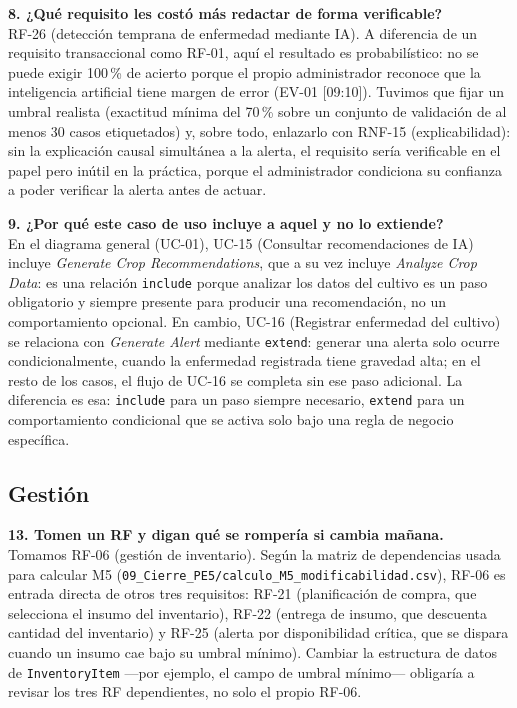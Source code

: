 \medskip
\noindent\textbf{8. ¿Qué requisito les costó más redactar de forma verificable?}\\
RF-26 (detección temprana de enfermedad mediante IA). A diferencia de un requisito transaccional como RF-01, aquí el resultado es probabilístico: no se puede exigir 100\,\% de acierto porque el propio administrador reconoce que la inteligencia artificial tiene margen de error (EV-01 [09:10]). Tuvimos que fijar un umbral realista (exactitud mínima del 70\,\% sobre un conjunto de validación de al menos 30 casos etiquetados) y, sobre todo, enlazarlo con RNF-15 (explicabilidad): sin la explicación causal simultánea a la alerta, el requisito sería verificable en el papel pero inútil en la práctica, porque el administrador condiciona su confianza a poder verificar la alerta antes de actuar.

\medskip
\noindent\textbf{9. ¿Por qué este caso de uso incluye a aquel y no lo extiende?}\\
En el diagrama general (UC-01), UC-15 (Consultar recomendaciones de IA) incluye \emph{Generate Crop Recommendations}, que a su vez incluye \emph{Analyze Crop Data}: es una relación \texttt{include} porque analizar los datos del cultivo es un paso obligatorio y siempre presente para producir una recomendación, no un comportamiento opcional. En cambio, UC-16 (Registrar enfermedad del cultivo) se relaciona con \emph{Generate Alert} mediante \texttt{extend}: generar una alerta solo ocurre condicionalmente, cuando la enfermedad registrada tiene gravedad alta; en el resto de los casos, el flujo de UC-16 se completa sin ese paso adicional. La diferencia es esa: \texttt{include} para un paso siempre necesario, \texttt{extend} para un comportamiento condicional que se activa solo bajo una regla de negocio específica.

\subsection*{Gestión}

\noindent\textbf{13. Tomen un RF y digan qué se rompería si cambia mañana.}\\
Tomamos RF-06 (gestión de inventario). Según la matriz de dependencias usada para calcular M5 (\texttt{09\_Cierre\_PE5/calculo\_M5\_modificabilidad.csv}), RF-06 es entrada directa de otros tres requisitos: RF-21 (planificación de compra, que selecciona el insumo del inventario), RF-22 (entrega de insumo, que descuenta cantidad del inventario) y RF-25 (alerta por disponibilidad crítica, que se dispara cuando un insumo cae bajo su umbral mínimo). Cambiar la estructura de datos de \texttt{InventoryItem} —por ejemplo, el campo de umbral mínimo— obligaría a revisar los tres RF dependientes, no solo el propio RF-06.

